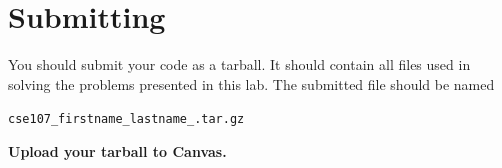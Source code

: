 \documentclass[11pt]{cselabheader}
\begin{document}
\newpage
\section{Submitting}

You should submit your code as a tarball. It should contain all files
used in solving the problems presented in this lab. The submitted file
should be named
\begin{center}
  \texttt{cse107\_firstname\_lastname\_.tar.gz}
\end{center}

\begin{center}
  \textbf{Upload your tarball to Canvas.}
\end{center}
\end{document}
